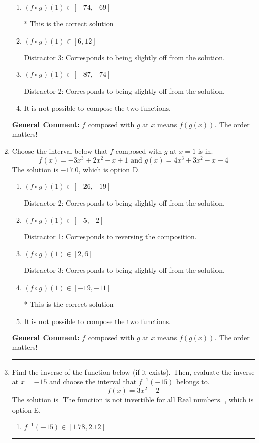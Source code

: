 \documentclass{extbook}[14pt]
\newcommand{\litem}[1]{\item #1

\rule{\textwidth}{0.4pt}}
\begin{document}
\begin{enumerate}
{\begin{enumerate}[label=\Alph*.]
 Distractor 1: Corresponds to reversing the composition.
\item \( (f \circ g)(1) \in [-74, -69] \)

* This is the correct solution
\item \( (f \circ g)(1) \in [6, 12] \)

 Distractor 3: Corresponds to being slightly off from the solution.
\item \( (f \circ g)(1) \in [-87, -74] \)

 Distractor 2: Corresponds to being slightly off from the solution.
\item \( \text{It is not possible to compose the two functions.} \)


\end{enumerate}

\textbf{General Comment:} $f$ composed with $g$ at $x$ means $f(g(x))$. The order matters!
}
\litem{
Choose the interval below that $f$ composed with $g$ at $x=1$ is in.
\[ f(x) = -3x^{3} +2 x^{2} -x + 1 \text{ and } g(x) = 4x^{3} +3 x^{2} -x -4 \]The solution is \( -17.0 \), which is option D.\begin{enumerate}[label=\Alph*.]
\item \( (f \circ g)(1) \in [-26, -19] \)

 Distractor 2: Corresponds to being slightly off from the solution.
\item \( (f \circ g)(1) \in [-5, -2] \)

 Distractor 1: Corresponds to reversing the composition.
\item \( (f \circ g)(1) \in [2, 6] \)

 Distractor 3: Corresponds to being slightly off from the solution.
\item \( (f \circ g)(1) \in [-19, -11] \)

* This is the correct solution
\item \( \text{It is not possible to compose the two functions.} \)


\end{enumerate}

\textbf{General Comment:} $f$ composed with $g$ at $x$ means $f(g(x))$. The order matters!
}
\litem{
Find the inverse of the function below (if it exists). Then, evaluate the inverse at $x = -15$ and choose the interval that $f^{-1}(-15)$ belongs to.
\[ f(x) = 3 x^2 - 2 \]The solution is \( \text{ The function is not invertible for all Real numbers. } \), which is option E.\begin{enumerate}[label=\Alph*.]
\item \( f^{-1}(-15) \in [1.78, 2.12] \)


\end{enumerate}}
\end{enumerate}
\end{document}
